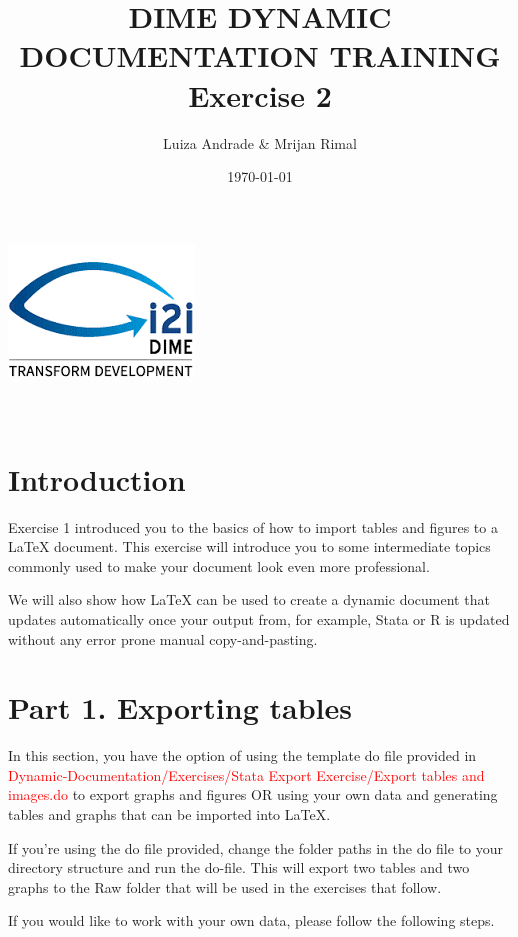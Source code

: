 \documentclass[12pts]{report}
\title{DIME DYNAMIC DOCUMENTATION TRAINING \\ Exercise 2}
\author{Luiza Andrade \& Mrijan Rimal}
\date{\today}
\begin{document}
	
	
	\makeatletter
	\begin{titlepage}
		\begin{center}
			\includegraphics[width=0.3\linewidth]{../img/i2i.png}\\[10ex]
			{\LARGE \bfseries  \@title }\\[2ex] 
			{\Large  \@author}\\[20ex] 
			{\large \@date}
		\end{center}
	\end{titlepage}
	\makeatother
	
\section*{Introduction}
Exercise 1 introduced you to the basics of how to import tables and figures to a {\LaTeX} document. This exercise will introduce you to some intermediate topics commonly used to make your document look even more professional.

We will also show how {\LaTeX} can be used to create a dynamic document that updates automatically once your output from, for example, Stata or R is updated without any error prone manual copy-and-pasting.

 

\section*{Part 1. Exporting tables}
In this section, you have the option of using the template do file provided in \textcolor{red}{Dynamic-Documentation/Exercises/Stata Export Exercise/Export tables and images.do} to export graphs and figures OR using your own data and generating tables and graphs that can be imported into {\LaTeX}. 

If you're using the do file provided, change the folder paths in the do file to your directory structure and run the do-file. This will export two tables and two graphs to the Raw folder that will be used in the exercises that follow.  

If you would like to work with your own data, please follow the following steps. 
\end{document}
